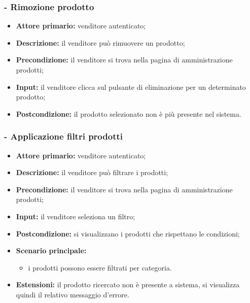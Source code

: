 \stepsubUserCase
\subsubsection{- Rimozione prodotto}
\begin{itemize}
    \item \textbf{Attore primario:} venditore autenticato;
    \item \textbf{Descrizione:} il venditore può rimuovere un prodotto;
    \item \textbf{Precondizione:} il venditore si trova nella pagina di amministrazione prodotti;
    \item \textbf{Input:} il venditore clicca sul pulsante di eliminazione per un determinato prodotto;
    \item \textbf{Postcondizione:} il prodotto selezionato non è più presente nel sistema.
\end{itemize}

\stepsubUserCase
\subsubsection{- Applicazione filtri prodotti}
\begin{itemize}
    \item \textbf{Attore primario:} venditore autenticato;
    \item \textbf{Descrizione:} il venditore può filtrare i prodotti;
    \item \textbf{Precondizione:} il venditore si trova nella pagina di amministrazione prodotti;
    \item \textbf{Input:} il venditore seleziona un filtro;
    \item \textbf{Postcondizione:} si visualizzano i prodotti che rispettano le condizioni;
    \item \textbf{Scenario principale:}
    \begin{itemize}
        \item i prodotti possono essere filtrati per categoria.
    \end{itemize}
    \item \textbf{Estensioni:} il prodotto ricercato non è presente a sistema, si visualizza quindi il relativo messaggio d'errore.
\end{itemize}

\stepsubUserCase
